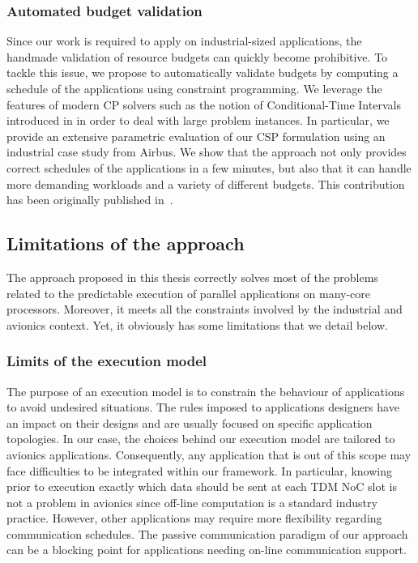\documentclass[main.tex]{subfiles}
\begin{document}
\subsubsection{Automated budget validation} Since our work is required to apply
on industrial-sized applications, the handmade validation of resource budgets
can quickly become prohibitive. To tackle this issue, we propose to
automatically validate budgets by computing a schedule of the applications
using constraint programming. We leverage the features of modern CP solvers
such as the notion of Conditional-Time Intervals introduced in \CPOpti in order
to deal with large problem instances. In particular, we provide an extensive
parametric evaluation of our CSP formulation using an industrial case study
from Airbus. We show that the approach not only provides correct schedules of
the applications in a few minutes, but also that it can handle more demanding
workloads and a variety of different budgets. This contribution has been
originally published in~\cite{Perret16_RTNS}.

\subsection{Limitations of the approach} The approach proposed in this thesis
correctly solves most of the problems related to the predictable execution of
parallel applications on many-core processors. Moreover, it meets all the
constraints involved by the industrial and avionics context. Yet, it obviously
has some limitations that we detail below.

\subsubsection{Limits of the execution model} The purpose of an execution model
is to constrain the behaviour of applications to avoid undesired situations.
The rules imposed to applications designers have an impact on their designs and
are usually focused on specific application topologies. In our case, the
choices behind our execution model are tailored to avionics applications.
Consequently, any application that is out of this scope may face difficulties
to be integrated within our framework. In particular, knowing prior to
execution exactly which data should be sent at each TDM NoC slot is not a
problem in avionics since off-line computation is a standard industry practice.
However, other applications may require more flexibility regarding
communication schedules. The passive communication paradigm of our approach can
be a blocking point for applications needing on-line communication support.
\end{document}
